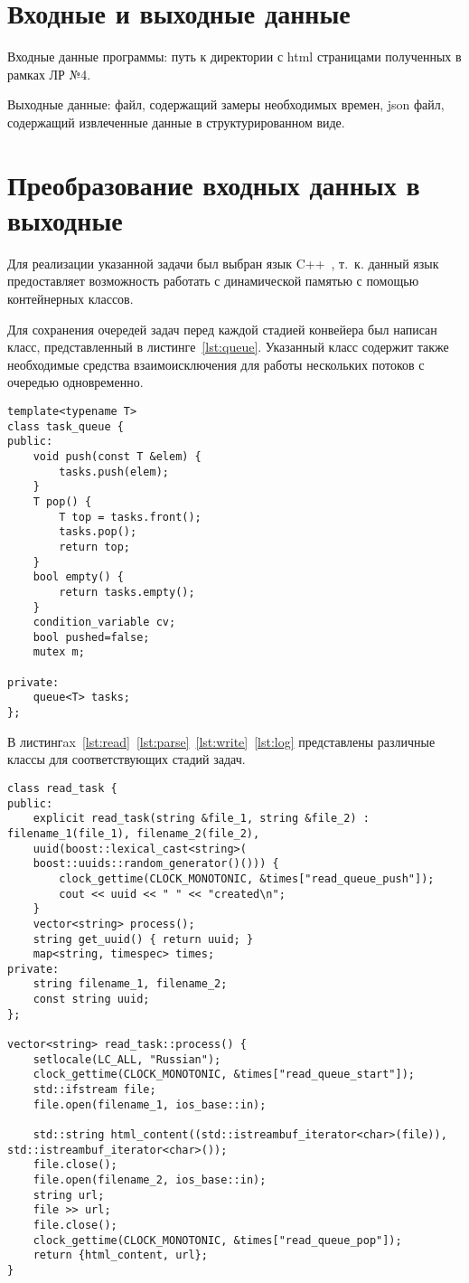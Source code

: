 \chapter{Входные и выходные данные}

Входные данные программы: путь к директории с html страницами полученных в рамках ЛР №4.

Выходные данные: файл, содержащий замеры необходимых времен, json файл, содержащий извлеченные данные в структурированном виде.
\clearpage

\chapter{Преобразование входных данных в выходные}

Для реализации указанной задачи был выбран язык C++~\cite{cpp}, т.~к. данный язык предоставляет возможность работать с динамической памятью с помощью контейнерных классов.

Для сохранения очередей задач перед каждой стадией конвейера был написан класс, представленный в листинге~\ref{lst:queue}. Указанный класс содержит также необходимые средства взаимоисключения для работы нескольких потоков с очередью одновременно. 
\begin{lstlisting}[caption={Класс очереди задач}, label=lst:queue]
template<typename T>
class task_queue {
public:
	void push(const T &elem) {
		tasks.push(elem);
	}
	T pop() {
		T top = tasks.front();
		tasks.pop();
		return top;
	}
	bool empty() {
		return tasks.empty();
	}
	condition_variable cv;
	bool pushed=false;
	mutex m;
	
private:
	queue<T> tasks;
};
\end{lstlisting}

В листингax~\ref{lst:read}~\ref{lst:parse}~\ref{lst:write}~\ref{lst:log} представлены различные классы для соответствующих стадий задач.
\clearpage
\begin{lstlisting}[caption={Класс задачи на этапе чтения файлов}, label=lst:read]
class read_task {
public:
	explicit read_task(string &file_1, string &file_2) : filename_1(file_1), filename_2(file_2),
	uuid(boost::lexical_cast<string>(
	boost::uuids::random_generator()())) {
		clock_gettime(CLOCK_MONOTONIC, &times["read_queue_push"]);
		cout << uuid << " " << "created\n";
	}
	vector<string> process();
	string get_uuid() { return uuid; }
	map<string, timespec> times;
private:
	string filename_1, filename_2;
	const string uuid;
};

vector<string> read_task::process() {
	setlocale(LC_ALL, "Russian");
	clock_gettime(CLOCK_MONOTONIC, &times["read_queue_start"]);
	std::ifstream file;
	file.open(filename_1, ios_base::in);
	
	std::string html_content((std::istreambuf_iterator<char>(file)), std::istreambuf_iterator<char>());
	file.close();
	file.open(filename_2, ios_base::in);
	string url;
	file >> url;
	file.close();
	clock_gettime(CLOCK_MONOTONIC, &times["read_queue_pop"]);
	return {html_content, url};
}
\end{lstlisting}

